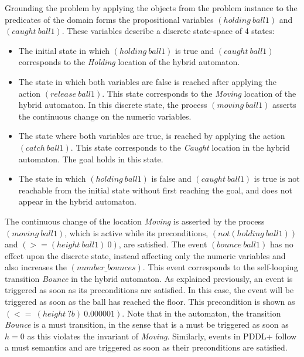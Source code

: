 Grounding the problem by applying the objects from the problem instance to the predicates of the domain forms the propositional variables $(holding\ ball1)$ and $(caught\ ball1)$. These variables describe a discrete state-space of 4 states:
\begin{itemize}
\item The initial state in which $(holding\ ball1)$ is true and $(caught\ ball1)$ corresponds to the \emph{Holding} location of the hybrid automaton.
\item The state in which both variables are false is reached after applying the action $(release\ ball1)$. This state corresponds to the \emph{Moving} location of the hybrid automaton. In this discrete state, the process $(moving\ ball1)$ asserts the continuous change on the numeric variables.
\item The state where both variables are true, is reached by applying the action $(catch\ ball1)$. This state corresponds to the \emph{Caught} location in the hybrid automaton. The goal holds in this state.
\item The state in which $(holding\ ball1)$ is false and $(caught\ ball1)$ is true is not reachable from the initial state without first reaching the goal, and does not appear in the hybrid automaton.
\end{itemize}

The continuous change of the location \emph{Moving} is asserted by the process $(moving\ ball1)$, which is active while its preconditions, $(not (holding\ ball1))$ and $(>= (height\ ball1)\ 0)$, are satisfied. The event $(bounce\ ball1)$ has no effect upon the discrete state, instead affecting only the numeric variables and also increases the $(number\_bounces)$. This event corresponds to the self-looping transition \emph{Bounce} in the hybrid automaton. As explained previously, an event is triggered as soon as its preconditions are satisfied. In this case, the event will be triggered as soon as the ball has reached the floor. This precondition is shown as $(<= \ (height \  ?b) \ 0.000001)$. Note that in the automaton, the transition \emph{Bounce} is a must transition, in the sense that is a must be triggered as soon as $h=0$ as this violates the invariant of \emph{Moving}. Similarly, events in PDDL+ follow a must semantics and are triggered as soon as their preconditions are satisfied. 
